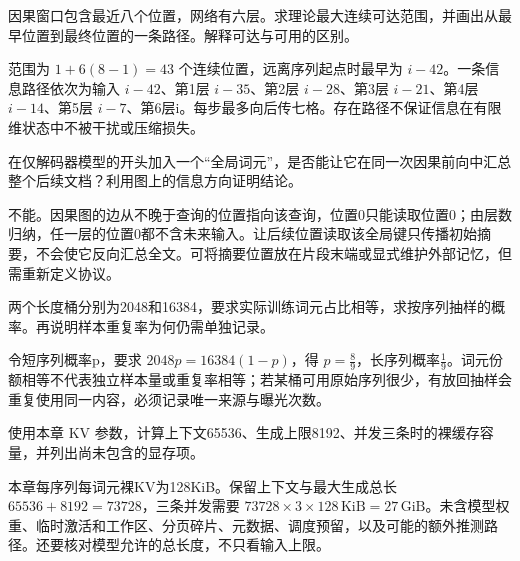 \begin{exercises}
\begin{exercise} 因果窗口包含最近八个位置，网络有六层。求理论最大连续可达范围，并画出从最早位置到最终位置的一条路径。解释可达与可用的区别。

\begin{solution}
范围为 $1+6(8-1)=43$ 个连续位置，远离序列起点时最早为 $i-42$。一条信息路径依次为输入 $i-42$、第1层 $i-35$、第2层 $i-28$、第3层 $i-21$、第4层 $i-14$、第5层 $i-7$、第6层i。每步最多向后传七格。存在路径不保证信息在有限维状态中不被干扰或压缩损失。
\end{solution}
\end{exercise}

\begin{exercise}\optional 在仅解码器模型的开头加入一个“全局词元”，是否能让它在同一次因果前向中汇总整个后续文档？利用图上的信息方向证明结论。

\begin{solution}
不能。因果图的边从不晚于查询的位置指向该查询，位置0只能读取位置0；由层数归纳，任一层的位置0都不含未来输入。让后续位置读取该全局键只传播初始摘要，不会使它反向汇总全文。可将摘要位置放在片段末端或显式维护外部记忆，但需重新定义协议。
\end{solution}
\end{exercise}

\begin{exercise} 两个长度桶分别为2048和16384，要求实际训练词元占比相等，求按序列抽样的概率。再说明样本重复率为何仍需单独记录。

\begin{solution}
令短序列概率p，要求 $2048p=16384(1-p)$，得 $p=\frac{8}{9}$，长序列概率$\frac{1}{9}$。词元份额相等不代表独立样本量或重复率相等；若某桶可用原始序列很少，有放回抽样会重复使用同一内容，必须记录唯一来源与曝光次数。
\end{solution}
\end{exercise}

\begin{exercise} 使用本章 KV 参数，计算上下文65536、生成上限8192、并发三条时的裸缓存容量，并列出尚未包含的显存项。

\begin{solution}
本章每序列每词元裸KV为128KiB。保留上下文与最大生成总长 $65536+8192=73728$，三条并发需要 $73728\times3\times128\,\mathrm{KiB}=27\,\mathrm{GiB}$。未含模型权重、临时激活和工作区、分页碎片、元数据、调度预留，以及可能的额外推测路径。还要核对模型允许的总长度，不只看输入上限。
\end{solution}
\end{exercise}


\end{exercises}
